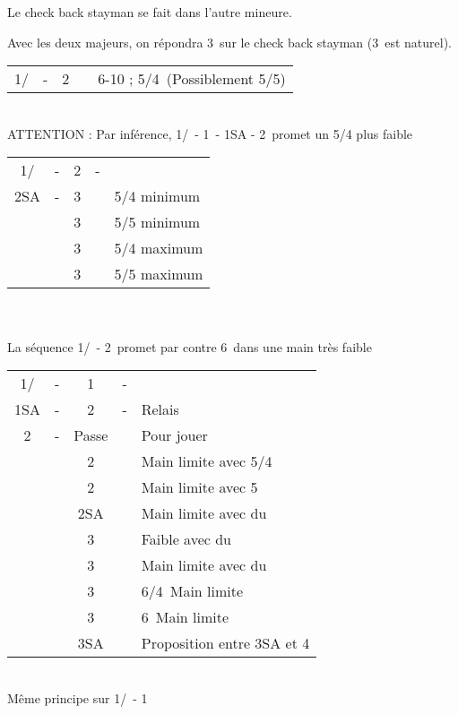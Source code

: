 \documentclass[a4paper, oneside, 11pt]{report}
\begin{document}
\newpage
		Le check back stayman se fait dans l'autre mineure.

		Avec les deux majeurs, on répondra 3\coeur\ sur le check back stayman (3\carreau\ est naturel).\\

		\begin{tabular}{cccc|l}
		1\trefle/\carreau & - & 2\coeur && 6-10 ; 5\pique/4\coeur\ (Possiblement 5/5)\\
		\end{tabular}\\
		ATTENTION : Par inférence, 1\trefle/\carreau\ - 1\pique\ - 1SA - 2\coeur\ promet un 5/4 plus faible\\
	
		\begin{tabular}{cccc|l}
		1\trefle/\carreau & - & 2\coeur & - &\\
		2SA & - & 3\trefle && 5/4 minimum\\
		&& 3\carreau && 5/5 minimum\\
		&& 3\coeur && 5/4 maximum\\
		&& 3\pique && 5/5 maximum\\
		\end{tabular}\\\\
	
		La séquence 1\trefle/\carreau\ - 2\pique\ promet par contre 6\pique\ dans une main très faible\\

		\begin{tabular}{cccc|l}
		1\trefle/\carreau & - & 1\pique & - &\\
		1SA & - & 2\trefle & - & Relais\\
		2\carreau & - & Passe && Pour jouer\\
		&& 2\coeur && Main limite avec 5\pique/4\coeur\\
		&& 2\pique && Main limite avec 5\pique\\
		&& 2SA && Main limite avec du \trefle\\
		&& 3\trefle && Faible avec du \trefle\\
		&& 3\carreau && Main limite avec du \carreau\\
		&& 3\coeur && 6\pique/4\coeur\ Main limite\\
		&& 3\pique && 6\pique\ Main limite\\
		&& 3SA && Proposition entre 3SA et 4\pique\\
		\end{tabular}\\
		Même principe sur 1\trefle/\carreau\ - 1\coeur\\
		
\end{document}
